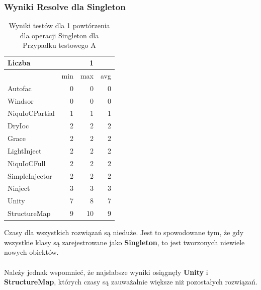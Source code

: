 \documentclass[12pt]{article}
\begin{document}
\subsubsection{Wyniki Resolve dla Singleton}
\begin{table}[H]
\captionsetup{belowskip=0pt,aboveskip=0pt}
\begin{center}
\begin{small}
	\begin{tabular}{ | l | r r r | }
    		\hline
Liczba & & 1 & \\ \hline
 & min & max & avg \\ \hline
Autofac & 0 & 0 & 0 \\ \hline
Windsor & 0 & 0 & 0 \\ \hline
NiquIoCPartial & 1 & 1 & 1 \\ \hline
DryIoc & 2 & 2 & 2 \\ \hline
Grace & 2 & 2 & 2 \\ \hline
LightInject & 2 & 2 & 2 \\ \hline
NiquIoCFull & 2 & 2 & 2 \\ \hline
SimpleInjector & 2 & 2 & 2 \\ \hline
Ninject & 3 & 3 & 3 \\ \hline
Unity & 7 & 8 & 7 \\ \hline
StructureMap & 9 & 10 & 9 \\ \hline
  	\end{tabular}
\end{small}
\end{center}
\caption{Wyniki testów dla 1 powtórzenia dla operacji Singleton dla Przypadku testowego A}
\label{TestCaseA_Singleton1}
\end{table}
Czasy dla wszystkich rozwiązań są nieduże. Jest to spowodowane tym, że gdy wszystkie klasy są zarejestrowane jako \textbf{Singleton}, to jest tworzonych niewiele nowych obiektów.\\
\\
Należy jednak wspomnieć, że najsłabsze wyniki osiągnęły \textbf{Unity} i \textbf{StructureMap}, których czasy są zauważalnie większe niż pozostałych rozwiązań.
\\ \\
\end{document}
